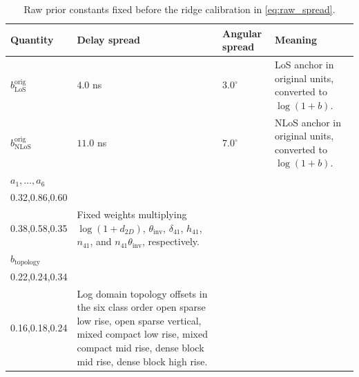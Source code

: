 \begin{table}[H]
\centering
\caption{Raw prior constants fixed before the ridge calibration in \eqref{eq:raw_spread}.}
\label{tab:spread_raw_constants}
\scriptsize
\setlength{\tabcolsep}{2pt}
\begin{tabularx}{\textwidth}{p{2.45cm}p{2.7cm}p{2.7cm}X}
\toprule
Quantity & Delay spread & Angular spread & Meaning \\
\midrule
\(b^{\mathrm{orig}}_{\mathrm{LoS}}\) & \(4.0\) ns & \(3.0^\circ\) &
LoS anchor in original units, converted to \(\log(1+b)\). \\
\(b^{\mathrm{orig}}_{\mathrm{NLoS}}\) & \(11.0\) ns & \(7.0^\circ\) &
NLoS anchor in original units, converted to \(\log(1+b)\). \\
\(a_1,\ldots,a_6\) &
\(\begin{array}{@{}l@{}}0.11,0.62,0.48,\\0.32,0.86,0.60\end{array}\) &
\(\begin{array}{@{}l@{}}0.05,0.52,0.60,\\0.38,0.58,0.35\end{array}\) &
Fixed weights multiplying \(\log(1+d_{2D})\), \(\theta_{\mathrm{inv}}\),
\(\delta_{41}\), \(h_{41}\), \(n_{41}\), and
\(n_{41}\theta_{\mathrm{inv}}\), respectively. \\
\(b_{\mathrm{topology}}\) &
\(\begin{array}{@{}l@{}}0.00,0.18,0.06,\\0.22,0.24,0.34\end{array}\) &
\(\begin{array}{@{}l@{}}0.00,0.09,0.05,\\0.16,0.18,0.24\end{array}\) &
Log domain topology offsets in the six class order
open sparse low rise, open sparse vertical, mixed compact low rise,
mixed compact mid rise, dense block mid rise, dense block high rise. \\
\bottomrule
\end{tabularx}
\end{table}

